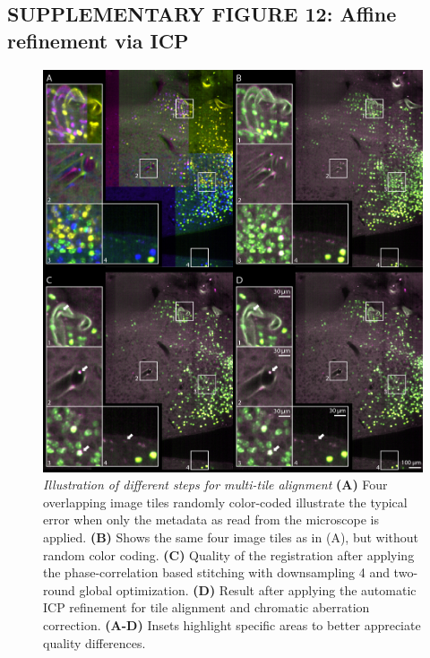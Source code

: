 \documentclass[]{spie}  %
\begin{document}
\subsection*{SUPPLEMENTARY FIGURE 12: Affine refinement via ICP}
\vspace{1mm}
\begin{figure}[h!]
\includegraphics[width=\textwidth]{fig-stitching_icp.jpg}
\vspace{-2.0mm}
\caption{\hspace{-0.5mm} \emph{Illustration of different steps for multi-tile alignment} \textbf{(A)} Four overlapping image tiles randomly color-coded illustrate the typical error when only the metadata as read from the microscope is applied. \textbf{(B)} Shows the same four image tiles as in (A), but without random color coding. \textbf{(C)} Quality of the registration after applying the phase-correlation based stitching with downsampling 4 and two-round global optimization. \textbf{(D)} Result after applying the automatic ICP refinement for tile alignment and chromatic aberration correction. \textbf{(A-D)} Insets highlight specific areas to better appreciate quality differences.
}
\label{fig:sup-fig-icp}
\end{figure}

\pagebreak
\end{document}
